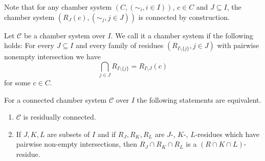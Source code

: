 Note that for any chamber system $(C,(\sim_i, i \in I))$, $c \in C$ and $J \subseteq I$, the chamber system $(R_J(c), (\sim_j, j \in J))$ is connected by construction.

\begin{defi}
	Let $\mathcal{C}$ be a chamber system over $I$. We call it a  chamber system if the following holds: For every $J \subseteq I$ and every family of residues $(R_{I \setminus \{j\}}, j \in J)$ with pairwise nonempty intersection we have
	$$ \bigcap_{j \in J} R_{I \setminus \{j\}} = R_{I \setminus J}(c) $$
	for some $c \in C$.
\end{defi}

\begin{lemm}
	For a connected chamber system $\mathcal{C}$ over $I$ the following statements are equivalent.
	\begin{enumerate}
		\item $\mathcal{C}$ is residually connected.
		\item If $J,K,L$ are subsets of $I$ and if $R_J, R_K, R_L$ are $J$-, $K$-, $L$-residues which have pairwise non-empty intersections, then $R_J \cap R_K \cap R_L$ is a $(R \cap K \cap L)$-residue.
	\end{enumerate}
\end{lemm}